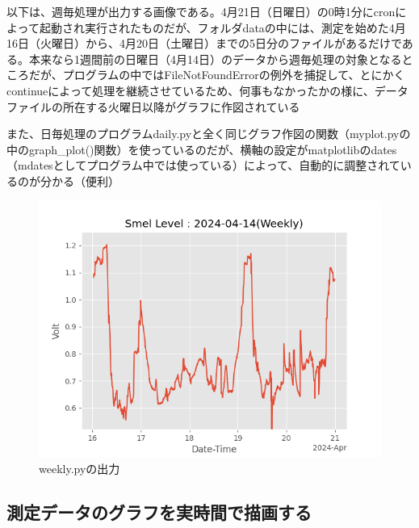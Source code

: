 \documentclass[12pt,a4j]{jsbook}
\begin{document}
以下は、週毎処理が出力する画像である。4月21日（日曜日）の0時1分にcronによって起動され実行されたものだが、フォルダdataの中には、測定を始めた4月16日（火曜日）から、4月20日（土曜日）までの5日分のファイルがあるだけである。本来なら1週間前の日曜日（4月14日）のデータから週毎処理の対象となるところだが、プログラムの中ではFileNotFoundErrorの例外を捕捉して、とにかくcontinueによって処理を継続させているため、何事もなかったかの様に、データファイルの所在する火曜日以降がグラフに作図されている

また、日毎処理のプログラムdaily.pyと全く同じグラフ作図の関数（myplot.pyの中のgraph\_plot()関数）を使っているのだが、横軸の設定がmatplotlibのdates（mdatesとしてプログラム中では使っている）によって、自動的に調整されているのが分かる（便利）

\begin{figure}[htbp]
	\begin{minipage}[b]{1.0\linewidth}
		\centering
		\includegraphics[keepaspectratio, scale=0.8]{figs/png/Weekly_2024-04-14.png}
		\caption{weekly.pyの出力}
	\end{minipage}
\end{figure}


\subsection{測定データのグラフを実時間で描画する}
\end{document}
